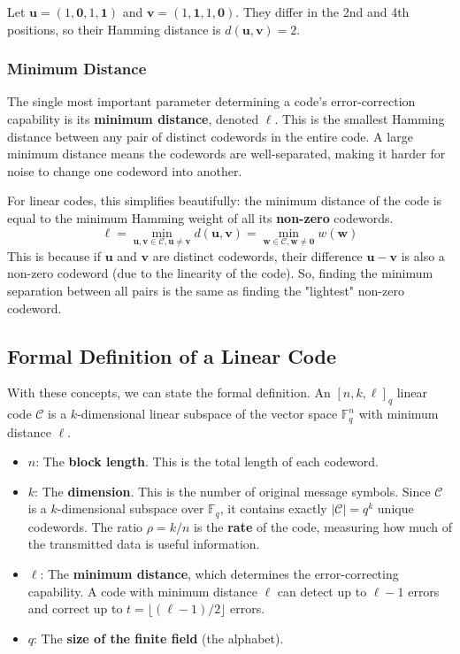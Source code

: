 \documentclass{article}
\begin{document}
\begin{tcolorbox}[title=Example: Hamming Distance]
Let $\mathbf{u} = (1, \mathbf{0}, 1, \mathbf{1})$ and $\mathbf{v} = (1, \mathbf{1}, 1, \mathbf{0})$. They differ in the 2nd and 4th positions, so their Hamming distance is $d(\mathbf{u}, \mathbf{v}) = 2$.
\end{tcolorbox}

\subsubsection{Minimum Distance}
The single most important parameter determining a code's error-correction capability is its \textbf{minimum distance}, denoted $\ell$. This is the smallest Hamming distance between any pair of distinct codewords in the entire code. A large minimum distance means the codewords are well-separated, making it harder for noise to change one codeword into another.

For linear codes, this simplifies beautifully: the minimum distance of the code is equal to the minimum Hamming weight of all its \textbf{non-zero} codewords.
\[
   \ell = \min_{\mathbf{u}, \mathbf{v} \in \mathcal{C}, \mathbf{u} \ne \mathbf{v}} d(\mathbf{u}, \mathbf{v}) = \min_{\mathbf{w} \in \mathcal{C}, \mathbf{w} \ne \mathbf{0}} w(\mathbf{w})
\]
This is because if $\mathbf{u}$ and $\mathbf{v}$ are distinct codewords, their difference $\mathbf{u}-\mathbf{v}$ is also a non-zero codeword (due to the linearity of the code). So, finding the minimum separation between all pairs is the same as finding the "lightest" non-zero codeword.

\subsection{Formal Definition of a Linear Code}
With these concepts, we can state the formal definition. An $[n, k, \ell]_q$ linear code $\mathcal{C}$ is a $k$-dimensional linear subspace of the vector space $\mathbb{F}_q^n$ with minimum distance $\ell$.

\begin{itemize}
    \item $n$: The \textbf{block length}. This is the total length of each codeword.
    \item $k$: The \textbf{dimension}. This is the number of original message symbols. Since $\mathcal{C}$ is a $k$-dimensional subspace over $\mathbb{F}_q$, it contains exactly $|\mathcal{C}| = q^k$ unique codewords. The ratio $\rho = k/n$ is the \textbf{rate} of the code, measuring how much of the transmitted data is useful information.
    \item $\ell$: The \textbf{minimum distance}, which determines the error-correcting capability. A code with minimum distance $\ell$ can detect up to $\ell-1$ errors and correct up to $t = \lfloor(\ell-1)/2\rfloor$ errors.
    \item $q$: The \textbf{size of the finite field} (the alphabet).
\end{itemize}
\end{document}
